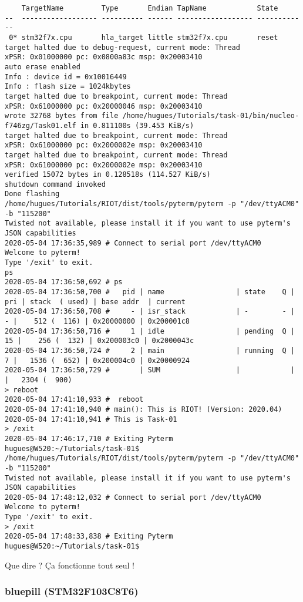 {\begin{verbatim}
    TargetName         Type       Endian TapName            State       
--  ------------------ ---------- ------ ------------------ ------------
 0* stm32f7x.cpu       hla_target little stm32f7x.cpu       reset
target halted due to debug-request, current mode: Thread 
xPSR: 0x01000000 pc: 0x0800a83c msp: 0x20003410
auto erase enabled
Info : device id = 0x10016449
Info : flash size = 1024kbytes
target halted due to breakpoint, current mode: Thread 
xPSR: 0x61000000 pc: 0x20000046 msp: 0x20003410
wrote 32768 bytes from file /home/hugues/Tutorials/task-01/bin/nucleo-f746zg/Task01.elf in 0.811100s (39.453 KiB/s)
target halted due to breakpoint, current mode: Thread 
xPSR: 0x61000000 pc: 0x2000002e msp: 0x20003410
target halted due to breakpoint, current mode: Thread 
xPSR: 0x61000000 pc: 0x2000002e msp: 0x20003410
verified 15072 bytes in 0.128518s (114.527 KiB/s)
shutdown command invoked
Done flashing
/home/hugues/Tutorials/RIOT/dist/tools/pyterm/pyterm -p "/dev/ttyACM0" -b "115200" 
Twisted not available, please install it if you want to use pyterm's JSON capabilities
2020-05-04 17:36:35,989 # Connect to serial port /dev/ttyACM0
Welcome to pyterm!
Type '/exit' to exit.
ps
2020-05-04 17:36:50,692 # ps
2020-05-04 17:36:50,700 # 	pid | name                 | state    Q | pri | stack  ( used) | base addr  | current     
2020-05-04 17:36:50,708 # 	  - | isr_stack            | -        - |   - |    512 (  116) | 0x20000000 | 0x200001c8
2020-05-04 17:36:50,716 # 	  1 | idle                 | pending  Q |  15 |    256 (  132) | 0x200003c0 | 0x2000043c 
2020-05-04 17:36:50,724 # 	  2 | main                 | running  Q |   7 |   1536 (  652) | 0x200004c0 | 0x20000924 
2020-05-04 17:36:50,729 # 	    | SUM                  |            |     |   2304 (  900)
> reboot
2020-05-04 17:41:10,933 #  reboot
2020-05-04 17:41:10,940 # main(): This is RIOT! (Version: 2020.04)
2020-05-04 17:41:10,941 # This is Task-01
> /exit
2020-05-04 17:46:17,710 # Exiting Pyterm
hugues@W520:~/Tutorials/task-01$ /home/hugues/Tutorials/RIOT/dist/tools/pyterm/pyterm -p "/dev/ttyACM0" -b "115200"
Twisted not available, please install it if you want to use pyterm's JSON capabilities
2020-05-04 17:48:12,032 # Connect to serial port /dev/ttyACM0
Welcome to pyterm!
Type '/exit' to exit.
> /exit
2020-05-04 17:48:33,838 # Exiting Pyterm
hugues@W520:~/Tutorials/task-01$
\end{verbatim}
}
Que dire ? Ça fonctionne tout seul !\\

\subsubsection{bluepill (STM32F103C8T6)}

